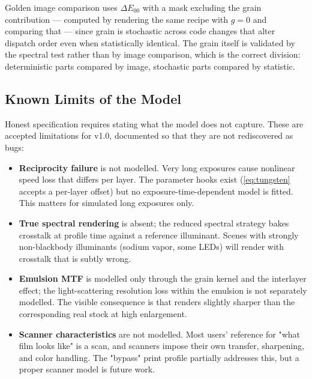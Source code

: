 Golden image comparison uses $\Delta E_{00}$ with a mask excluding the grain
contribution --- computed by rendering the same recipe with $g = 0$ and
comparing that --- since grain is stochastic across code changes that alter
dispatch order even when statistically identical. The grain itself is validated
by the spectral test rather than by image comparison, which is the correct
division: deterministic parts compared by image, stochastic parts compared by
statistic.

\subsection{Known Limits of the Model}

Honest specification requires stating what the model does not capture. These are
accepted limitations for v1.0, documented so that they are not rediscovered as
bugs:

\begin{itemize}
\item \textbf{Reciprocity failure} is not modelled. Very long exposures cause
nonlinear speed loss that differs per layer. The parameter hooks exist
(\eqref{eq:tungsten} accepts a per-layer offset) but no exposure-time-dependent
model is fitted. This matters for simulated long exposures only.
\item \textbf{True spectral rendering} is absent; the reduced spectral strategy
bakes crosstalk at profile time against a reference illuminant. Scenes with
strongly non-blackbody illuminants (sodium vapor, some LEDs) will render with
crosstalk that is subtly wrong.
\item \textbf{Emulsion MTF} is modelled only through the grain kernel and the
interlayer effect; the light-scattering resolution loss within the emulsion is
not separately modelled. The visible consequence is that \EM{} renders slightly
sharper than the corresponding real stock at high enlargement.
\item \textbf{Scanner characteristics} are not modelled. Most users' reference
for "what film looks like" is a scan, and scanners impose their own transfer,
sharpening, and color handling. The "bypass" print profile partially addresses
this, but a proper scanner model is future work.
\end{itemize}
